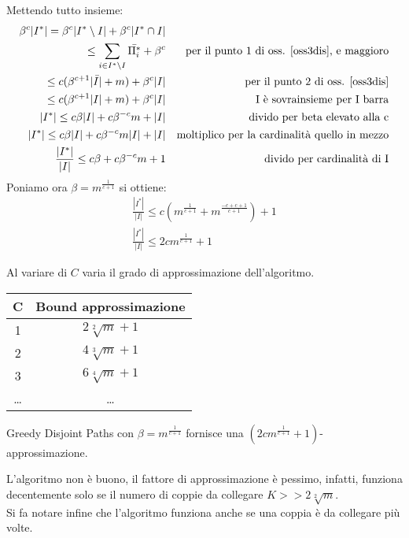 Mettendo tutto insieme: 
\begin{equation}
    \begin{aligned}
        \beta^c|I^*| = \beta^c|I^* \setminus I| + \beta^c|I^* \cap I|\\
        \leq \sum_{i \in I^* \setminus I} \bar{\Pi_i^*} + \beta^c && \text{per il punto 1 di oss. \ref{oss3dis}, e maggioro}\\
        \leq c(\beta^{c+1}|\bar{I}| + m) + \beta^c |I|&& \text{per il punto 2 di oss. \ref{oss3dis}}\\
        \leq c(\beta^{c+1}|I| + m) + \beta^c |I|&& \text{I è sovrainsieme per I barra}\\
        |I^*| \leq c\beta|I| + c\beta^{-c}m + |I|&& \text{divido per beta elevato alla c}\\
        |I^*| \leq c\beta|I| + c\beta^{-c }m|I| + |I|&& \text{moltiplico per la cardinalità quello in mezzo}\\
        \frac{|I^*|}{|I|} \leq c\beta + c\beta^{-c}m + 1&& \text{divido per cardinalità di I}
    \end{aligned}
\end{equation}
Poniamo ora $\beta = m^{\frac{1}{c+1}}$ si ottiene:
\begin{equation}
    \begin{aligned}
        \frac{|I^*|}{|I|} \leq c(m^{\frac{1}{c+1}} + m^{\frac{-c+c+1}{c+1}}) + 1\\
        \frac{|I^*|}{|I|} \leq 2cm^{\frac{1}{c+1}} +1
    \end{aligned}
\end{equation}

Al variare di $C$ varia il grado di approssimazione dell'algoritmo.
\begin{center}
    \begin{tabular}{ c c  }
     C & Bound approssimazione \\
     \hline 
     1 & $2\sqrt[2]{m} + 1$ \\  
     2 & $4\sqrt[3]{m} + 1$ \\  
     3 & $6\sqrt[4]{m} + 1$ \\  
    \dots & \dots
    \end{tabular}
\end{center}
\begin{theorem}
    Greedy Disjoint Paths con  $\beta = m^{\frac{1}{c+1}}$ fornisce una $(2cm^{\frac{1}{c+1}} +1)$-approssimazione.
\end{theorem}
\begin{remark}
    L'algoritmo non è buono, il fattore di approssimazione è pessimo, infatti, funziona decentemente solo 
    se il numero di coppie da collegare $K >> 2\sqrt[2]{m}$.\\
    Si fa notare infine che l'algoritmo funziona anche se una coppia è da collegare più volte.
\end{remark}

